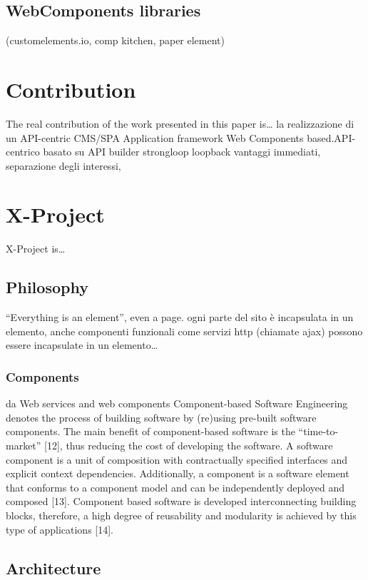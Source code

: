 \documentclass{sig-alternate}
\begin{document}
\subsection{WebComponents libraries}

(customelements.io, comp kitchen, paper element)

\section{Contribution}

The real contribution of the work presented in this paper is…
la realizzazione di un API-centric CMS/SPA Application framework Web Components based.API-centrico basato su API builder strongloop loopback vantaggi immediati, separazione degli interessi, 

\section{X-Project}

X-Project is…

\subsection{Philosophy}

“Everything is an element”, even a page. 
ogni parte del sito è incapsulata in un elemento, anche componenti funzionali come servizi http (chiamate ajax) possono essere incapsulate in un elemento…

\subsubsection{Components}

da Web services and web components
Component-based Software Engineering denotes the process of building software by (re)using pre-built software components. The main benefit of component-based software is the “time-to-market” [12], thus reducing the cost of developing the software. A software component is a unit of composition with contractually specified interfaces and explicit context dependencies. Additionally, a component is a software element that conforms to a component model and can be independently deployed and composed [13]. Component based software is developed interconnecting building blocks, therefore, a high degree of reusability and modularity is achieved by this type of applications [14].

\subsection{Architecture}
\end{document}
